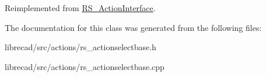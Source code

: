 Reimplemented from \hyperlink{classRS__ActionInterface_af1a8d898a8bf0521295d7c45d80e6d09}{R\-S\-\_\-\-Action\-Interface}.



The documentation for this class was generated from the following files\-:\begin{DoxyCompactItemize}
\item 
librecad/src/actions/rs\-\_\-actionselectbase.\-h\item 
librecad/src/actions/rs\-\_\-actionselectbase.\-cpp\end{DoxyCompactItemize}
